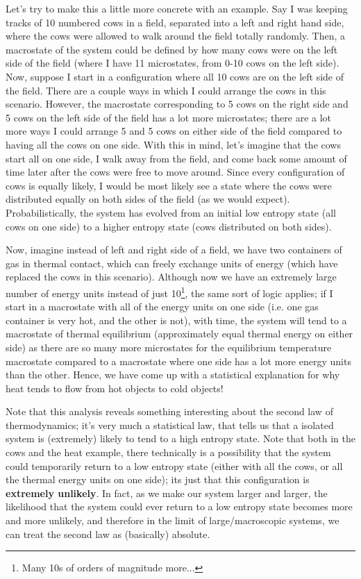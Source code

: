 Let's try to make this a little more concrete with an example. Say I was keeping tracks of 10 numbered cows in a field, separated into a left and right hand side, where the cows were allowed to walk around the field totally randomly. Then, a macrostate of the system could be defined by how many cows were on the left side of the field (where I have 11 microstates, from 0-10 cows on the left side). Now, suppose I start in a configuration where all 10 cows are on the left side of the field. There are a couple ways in which I could arrange the cows in this scenario. However, the macrostate corresponding to 5 cows on the right side and 5 cows on the left side of the field has a lot more microstates; there are a lot more ways I could arrange 5 and 5 cows on either side of the field compared to having all the cows on one side. With this in mind, let's imagine that the cows start all on one side, I walk away from the field, and come back some amount of time later after the cows were free to move around. Since every configuration of cows is equally likely, I would be most likely see a state where the cows were distributed equally on both sides of the field (as we would expect). Probabilistically, the system has evolved from an initial low entropy state (all cows on one side) to a higher entropy state (cows distributed on both sides).

Now, imagine instead of left and right side of a field, we have two containers of gas in thermal contact, which can freely exchange units of energy (which have replaced the cows in this scenario). Although now we have an extremely large number of energy units instead of just 10\footnote{Many 10s of orders of magnitude more...}, the same sort of logic applies; if I start in a macrostate with all of the energy units on one side (i.e. one gas container is very hot, and the other is not), with time, the system will tend to a macrostate of thermal equilibrium (approximately equal thermal energy on either side) as there are so many more microstates for the equilibrium temperature macrostate compared to a macrostate where one side has a lot more energy units than the other. Hence, we have come up with a statistical explanation for why heat tends to flow from hot objects to cold objects!

Note that this analysis reveals something interesting about the second law of thermodynamics; it's very much a statistical law, that tells us that a isolated system is (extremely) likely to tend to a high entropy state. Note that both in the cows and the heat example, there technically is a possibility that the system could temporarily return to a low entropy state (either with all the cows, or all the thermal energy units on one side); its just that this configuration is \textbf{extremely unlikely}. In fact, as we make our system larger and larger, the likelihood that the system could ever return to a low entropy state becomes more and more unlikely, and therefore in the limit of large/macroscopic systems, we can treat the second law as (basically) absolute. 

